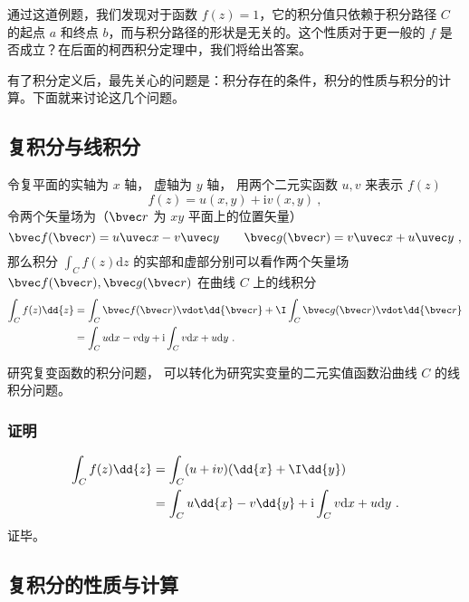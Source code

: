 通过这道例题，我们发现对于函数 $f(z)=1$，它的积分值只依赖于积分路径 $C$ 的起点 $a$ 和终点 $b$，而与积分路径的形状是无关的。这个性质对于更一般的 $f$ 是否成立？在后面的柯西积分定理中，我们将给出答案。

有了积分定义后，最先关心的问题是：积分存在的条件，积分的性质与积分的计算。下面就来讨论这几个问题。

\subsection{复积分与线积分}
\begin{theorem}{}\label{the_CpxInt_1}
令复平面的实轴为 $x$ 轴， 虚轴为 $y$ 轴， 用两个二元实函数 $u, v$ 来表示 $f(z)$
\begin{equation}
f (z) = u(x, y) + \mathrm iv(x, y)~,
\end{equation}
令两个矢量场为（$\bvec r$ 为 $xy$ 平面上的位置矢量）
\begin{equation}
\bvec f(\bvec r) = u\uvec x - v\uvec y
\qquad
\bvec g(\bvec r) = v\uvec x + u\uvec y~,
\end{equation}
那么积分 $\int_{C} f(z) \mathrm{d} z$ 的实部和虚部分别可以看作两个矢量场 $\bvec f(\bvec r), \bvec g(\bvec r)$ 在曲线 $C$ 上的线积分
\begin{equation}
\begin{aligned}
\int_{C} f(z) \dd{z} &= \int_C \bvec f(\bvec r) \vdot \dd{\bvec r} + \I \int_C \bvec g(\bvec r) \vdot \dd{\bvec r}\\
&= \int_{C} u \mathrm{d} x-v \mathrm{d} y+\mathrm{i} \int_{C} v \mathrm{d} x+u \mathrm{d} y~.
\end{aligned}
\end{equation}
\end{theorem}
研究复变函数的积分问题， 可以转化为研究实变量的二元实值函数沿曲线 $C$ 的线积分问题。

\subsubsection{证明}
\begin{equation}
\begin{aligned}
\int_C f(z) \dd{z} &= \int_C (u+iv)(\dd{x} + \I \dd{y})\\
&= \int_C u\dd{x} - v\dd{y} + \mathrm{i} \int_{C} v \mathrm{d} x+u \mathrm{d} y~.
\end{aligned}
\end{equation}
证毕。

\subsection{复积分的性质与计算}


